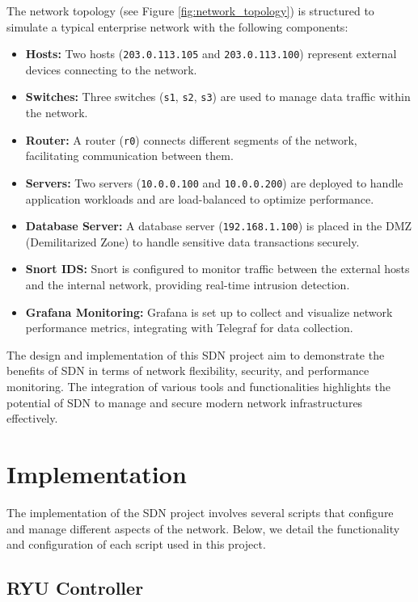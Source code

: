 \documentclass[a4paper,12pt]{article}
\begin{document}
The network topology (see Figure \ref{fig:network_topology}) is structured to simulate a typical enterprise network with the following components:

\begin{itemize}
    \item \textbf{Hosts:} Two hosts (\texttt{203.0.113.105} and \texttt{203.0.113.100}) represent external devices connecting to the network.
    \item \textbf{Switches:} Three switches (\texttt{s1}, \texttt{s2}, \texttt{s3}) are used to manage data traffic within the network.
    \item \textbf{Router:} A router (\texttt{r0}) connects different segments of the network, facilitating communication between them.
    \item \textbf{Servers:} Two servers (\texttt{10.0.0.100} and \texttt{10.0.0.200}) are deployed to handle application workloads and are load-balanced to optimize performance.
    \item \textbf{Database Server:} A database server (\texttt{192.168.1.100}) is placed in the DMZ (Demilitarized Zone) to handle sensitive data transactions securely.
    \item \textbf{Snort IDS:} Snort is configured to monitor traffic between the external hosts and the internal network, providing real-time intrusion detection.
    \item \textbf{Grafana Monitoring:} Grafana is set up to collect and visualize network performance metrics, integrating with Telegraf for data collection.
\end{itemize}

The design and implementation of this SDN project aim to demonstrate the benefits of SDN in terms of network flexibility, security, and performance monitoring. The integration of various tools and functionalities highlights the potential of SDN to manage and secure modern network infrastructures effectively.



\section{Implementation}

The implementation of the SDN project involves several scripts that configure and manage different aspects of the network. Below, we detail the functionality and configuration of each script used in this project.

\subsection{RYU Controller}
\end{document}

